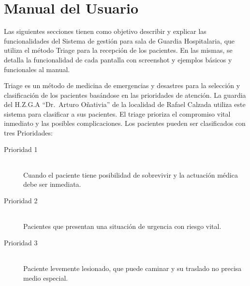 \section{Manual del Usuario}
Las siguientes secciones tienen como objetivo describir y explicar las funcionalidades del Sistema de gestión para sala de Guardia Hospitalaria, que utiliza el método Triage para la recepción de los pacientes. En las mismas, se detalla la funcionalidad de cada pantalla con screenshot y ejemplos básicos y funcionales al manual.

Triage es un método de medicina de emergencias y desastres para la selección y clasificación de los pacientes basándose en las prioridades de atención. La guardia del H.Z.G.A ``Dr.\ Arturo Oñativia'' de la localidad de Rafael Calzada utiliza este sistema para clasificar a sus pacientes. El triage prioriza el compromiso vital inmediato y las posibles complicaciones.
Los pacientes pueden ser clasificados con tres Prioridades:

\begin{description}
\item[Prioridad 1] \mbox{} \\ 
Cuando el paciente tiene posibilidad de sobrevivir y la actuación médica debe ser inmediata.
\item[Prioridad 2] \mbox{} \\ 
Pacientes que presentan una situación de urgencia con riesgo vital.
\item[Prioridad 3] \mbox{} \\ 
Paciente levemente lesionado, que puede caminar y su traslado no precisa medio especial.

\end{description}

